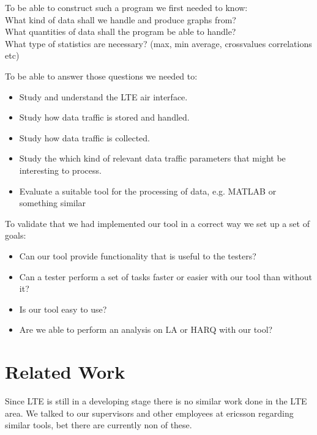 \documentclass[cropmarks, frame, english]{idamasterthesis}
\begin{document}
\setlength{\parindent}{0cm} To be able to construct such a program we first needed to know:\\
What kind of data shall we handle and produce graphs from? \\
    What quantities of data shall the program be able to handle? \\
   What type of statistics are necessary? (max, min average, crossvalues correlations etc)


To be able to answer those questions we needed to:
\begin{itemize}
\item Study and understand the LTE air interface.
\item Study how data traffic is stored and handled.
\item Study how data traffic is collected.
\item Study the which kind of relevant data traffic parameters that might be interesting to process.
\item Evaluate a suitable tool for the processing of data, e.g. MATLAB or something similar
\end{itemize}

To validate that we had implemented our tool in a correct way we set up a set of goals:
\begin{itemize}
   \item Can our tool provide functionality that is useful to the testers?
   \item Can a tester perform a set of tasks faster or easier with our tool than without it?
   \item Is our tool easy to use?
   \item Are we able to perform an analysis on LA or HARQ with our tool?
\end{itemize}

\section{Related Work}
Since LTE is still in a developing stage there is no similar work done in the LTE area. We talked to our supervisors and other employees at ericsson regarding similar tools, bet there are currently non of these. 
\end{document}
